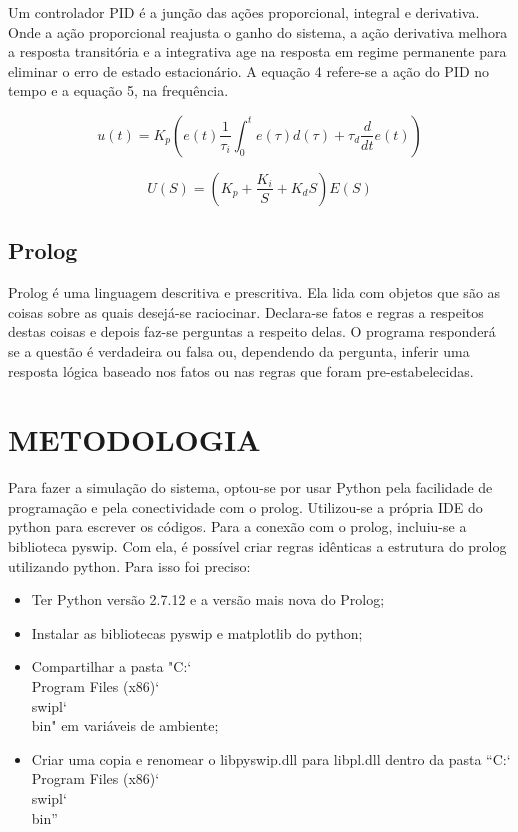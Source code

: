 \documentclass[a4paper,12pt]{article}
\begin{document}
Um controlador PID é a junção das ações proporcional, integral e derivativa. Onde a ação proporcional reajusta o ganho do sistema, a ação derivativa melhora a resposta transitória e a integrativa age na resposta em regime permanente para eliminar o erro de estado estacionário. A equação 4 refere-se a ação do PID no tempo e a equação 5, na frequência.

\begin{equation} \label{PID no tempo}
u(t) = K_{p} \left (e(t)\frac{1}{\tau_{i}} \int_{0}^{t} e(\tau)d(\tau) + \tau_{d}\frac{d}{dt}e(t) \right)
 \end{equation}
\label{PID no tempo}

\begin{equation} \label{PID na frequência}
U(S) = \left (K_{p} +\frac{K_{i} }{S} + K_{d}S\right)E(S)
 \end{equation}
\label{PID na frequência}


\subsection{Prolog}

Prolog é uma linguagem descritiva e prescritiva. Ela lida com objetos que são as coisas sobre as quais desejá-se raciocinar. Declara-se fatos e regras a respeitos destas coisas e depois faz-se perguntas a respeito delas. O programa responderá se a questão é verdadeira ou falsa ou, dependendo da pergunta, inferir uma resposta lógica baseado nos fatos ou nas regras que foram pre-estabelecidas.


\newpage

\thispagestyle{main}

\section{METODOLOGIA}

Para fazer a simulação do sistema, optou-se por usar Python pela facilidade de programação e pela conectividade com o prolog. Utilizou-se a própria IDE do python para escrever os códigos. Para a conexão com o prolog, incluiu-se a biblioteca pyswip. Com ela, é possível criar regras idênticas a estrutura do prolog utilizando python. Para isso foi preciso: 

\begin{itemize}
\item Ter Python versão 2.7.12 e a versão mais nova do Prolog;
\item Instalar as bibliotecas pyswip e matplotlib do python;
\item Compartilhar a pasta "C:\char`\\Program Files (x86)\char`\\swipl\char`\\bin" em variáveis de ambiente;
\item Criar uma copia e renomear o libpyswip.dll para libpl.dll dentro da pasta “C:\char`\\Program Files (x86)\char`\\swipl\char`\\bin”
\end{itemize}
\end{document}
